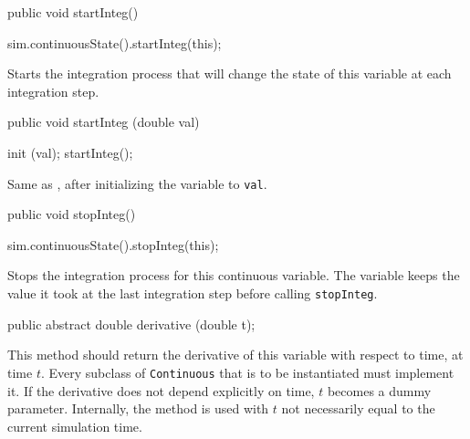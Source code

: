 \begin{htmlonly}
\end{htmlonly}
\begin{code}

   public void startInteg() \begin{hide} {
      sim.continuousState().startInteg(this);
   } \end{hide}
\end{code}
 \begin{tabb}  Starts the integration process that will change the state of
  this variable at each integration step.
 \end{tabb}
\begin{code}

   public void startInteg (double val) \begin{hide} {
      init (val);   startInteg();
   } \end{hide}
\end{code}
 \begin{tabb}  Same as , after initializing the variable 
   to \texttt{val}.
 \end{tabb}
\begin{htmlonly}
\end{htmlonly}
\begin{code}

   public void stopInteg() \begin{hide} {
      sim.continuousState().stopInteg(this);
   } \end{hide}
\end{code}
 \begin{tabb}  Stops the integration process for this continuous variable.
  The variable keeps the value it took at the last integration step
  before calling \texttt{stopInteg}.
 \end{tabb}
\begin{code}

   public abstract double derivative (double t);
\end{code}
  \begin{tabb}  This method should return the derivative of this variable
   with respect to time, at time $t$.
   Every subclass of \texttt{Continuous} that is to be instantiated 
   must implement it.
   If the derivative does not depend explicitly on time, $t$ becomes
   a dummy parameter.  Internally, the method is used with $t$ not
   necessarily equal to the current simulation time.
  \end{tabb}
